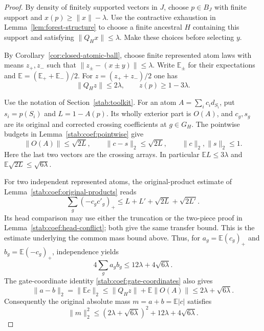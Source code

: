 \begin{proof}
By density of finitely supported vectors in $J$, choose
$p\in B_J$ with finite support and $x(p)\ge\|x\|-\lambda$.
Use the contractive exhaustion in Lemma~\ref{lem:forest-structure}
to choose a finite ancestral $H$ containing this support and satisfying
$\|Q_Hx\|\le\lambda$.  Make these choices before selecting $y$.

By Corollary~\ref{cor:closed-atomic-ball}, choose finite represented
atom laws with means $z_+,z_-$ such that
$\|z_\pm-(x\pm y)\|\le\lambda$.  Write $\mathbb E_\pm$ for
their expectations and $\mathbb E=(\mathbb E_++\mathbb E_-)/2$.
For $z=(z_++z_-)/2$ one has
\begin{equation}\label{molx:actual-center-budget}
 \|Q_Hz\|\le2\lambda,\qquad
 z(p)\ge1-3\lambda.
\end{equation}

Use the notation of Section~\ref{stab:toolkit}.  For an atom
$A=\sum_i c_i d_{S_i}$, put $s_i=p(S_i)$ and $L=1-A(p)$.
Its wholly exterior part is $O(A)$, and $c_g,s_g$ are its original
and corrected crossing coefficients at $g\in G_H$.  The pointwise
budgets in Lemma~\ref{stab:coef:pointwise} give
\[
 \|O(A)\|\le\sqrt{2L},\qquad
 \|c-s\|_2\le\sqrt{2L},\qquad
 \|c\|_2,\|s\|_2\le1.
\]
Here the last two vectors are the crossing arrays.  In particular
$\mathbb EL\le3\lambda$ and
$\mathbb E\sqrt{2L}\le\sqrt{6\lambda}$.

For two independent represented atoms, the original-product estimate
of Lemma~\ref{stab:coef:original-products} reads
\begin{equation}\label{molx:actual-center-transfer}
 \sum_g(-c_gc'_g)_+
 \le L+L'+\sqrt{2L}+\sqrt{2L'}.
\end{equation}
Its head comparison may use either the truncation or the two-piece
proof in Lemma~\ref{stab:coef:head-conflict}; both give the same
transfer bound. This is the estimate underlying the common mass
bound above.
Thus, for $a_g=\mathbb E(c_g)_+$ and
$b_g=\mathbb E(-c_g)_+$, independence yields
\[
 4\sum_g a_gb_g\le12\lambda+4\sqrt{6\lambda}.
\]
The gate-coordinate identity
\eqref{stab:coef:gate-coordinates} also gives
\[
 \|a-b\|_2=\|\mathbb Ec\|_2
 \le\|Q_Hz\|+\mathbb E\|O(A)\|
 \le2\lambda+\sqrt{6\lambda}.
\]
Consequently the original absolute mass $m=a+b=\mathbb E|c|$
satisfies
\begin{equation}\label{molx:actual-center-mass}
 \|m\|_2^2\le(2\lambda+\sqrt{6\lambda})^2
                         +12\lambda+4\sqrt{6\lambda}.
\end{equation}


\end{proof}
